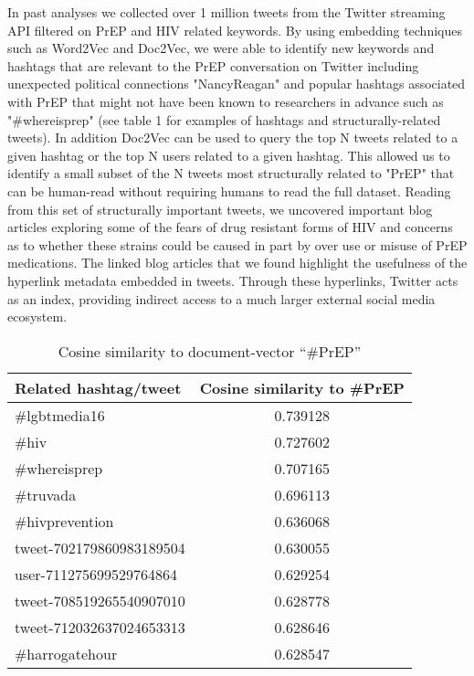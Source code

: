 In past analyses we collected over 1 million tweets from the Twitter streaming API filtered on PrEP and HIV related keywords. By using embedding techniques such as Word2Vec and Doc2Vec, we were able to identify new keywords and hashtags that are relevant to the PrEP conversation on Twitter including unexpected political connections "NancyReagan" and popular hashtags associated with PrEP that might not have been known to researchers in advance such as "\#whereisprep" (see table 1 for examples of hashtags and structurally-related tweets). In addition Doc2Vec can be used to query the top N tweets related to a given hashtag or the top N users related to a given hashtag. This allowed us to identify a small subset of the N tweets most structurally related to "PrEP" that can be human-read without requiring humans to read the full dataset. Reading from this set of structurally important tweets, we uncovered important blog articles exploring some of the fears of drug resistant forms of HIV and concerns as to whether these strains could be caused in part by over use or misuse of PrEP medications. The linked blog articles that we found highlight the usefulness of the hyperlink metadata embedded in tweets. Through these hyperlinks, Twitter acts as an index, providing indirect access to a much larger external social media ecosystem.

\begin{table}
\centering
\caption{Cosine similarity to document-vector ``\#PrEP''}
\begin{tabular}{|l|c|} \hline
Related hashtag/tweet & Cosine similarity to \#PrEP\\ \hline
\#lgbtmedia16 & 0.739128\\ \hline
\#hiv & 	0.727602 \\ \hline
\#whereisprep & 0.707165 \\ \hline
\#truvada & 0.696113 \\ \hline
\#hivprevention & 0.636068 \\ \hline
tweet-702179860983189504 & 0.630055\\ \hline
user-711275699529764864 & 0.629254\\ \hline
tweet-708519265540907010 & 0.628778 \\ \hline
tweet-712032637024653313 & 0.628646 \\ \hline
\#harrogatehour & 0.628547 \\ \hline
\hline\end{tabular}
\label{tbl:d2v}
\end{table}

